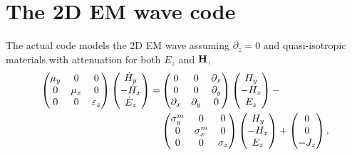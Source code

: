 \documentclass[a4paper,12pt]{article}
\begin{document}
\section*{The 2D EM wave code}
The actual code models the 2D EM wave assuming $\partial_z=0$ and quasi-isotropic materials with attenuation for both $E_z$ and ${\bf H}$,
\begin{align}
\begin{pmatrix} 
\mu_y & 0 & 0\cr 
0 & \mu_x & 0 \cr
0 & 0 & \varepsilon_z
\end{pmatrix}
%
\begin{pmatrix} 
\dot{H}_y \cr
-\dot{H}_x \cr
\dot{E}_z
\end{pmatrix}
%
=
%
&
\begin{pmatrix} 
0 & 0 & \partial_x \cr 
0 & 0 & \partial_y \cr
\partial_x & \partial_y & 0
\end{pmatrix}
%
\begin{pmatrix} 
H_y \cr
-H_x \cr
E_z
\end{pmatrix}
%
%
-\\
%
&
%
\begin{pmatrix} 
\sigma^m_y & 0 & 0\cr 
0 & \sigma^m_x & 0 \cr
0 & 0 & \sigma_z
\end{pmatrix}
%
\begin{pmatrix} 
H_y \cr
-H_x \cr
E_z
\end{pmatrix}
%
+
%
\begin{pmatrix} 
0 \cr
0 \cr
-J_z
\end{pmatrix}.
\end{align}
\clearpage
\end{document}
